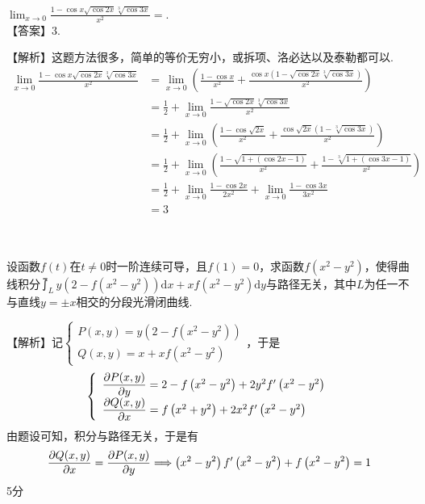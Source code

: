 \documentclass[11pt,twoside]{ctexart}
\begin{document}
\wq $\displaystyle\lim_{x\rightarrow 0}\displaystyle\frac{1-\cos x\sqrt{\cos 2x}\sqrt[3]{\cos 3x}}{x^2}=$\underline{\hspace{3em}}.\\
【答案】3.

【解析】这题方法很多，简单的等价无穷小，或拆项、洛必达以及泰勒都可以.
\begin{align*}
\lim_{x\rightarrow 0}\frac{1-\cos x\sqrt{\cos 2x}\sqrt[3]{\cos 3x}}{x^2}&=\lim_{x\rightarrow 0}\left(\frac{1-\cos x}{x^2}+\frac{\cos x\left(1-\sqrt{\cos 2x}\sqrt[3]{\cos 3x}\right)}{x^2}\right)\\
&=\frac{1}{2}+\lim_{x\rightarrow 0}\frac{1-\sqrt{\cos 2x}\sqrt[3]{\cos 3x}}{x^2}\\
&=\frac{1}{2}+\lim_{x\rightarrow 0}\left(\frac{1-\cos\sqrt{2x}}{x^2}+\frac{\cos\sqrt{2x}\left(1-\sqrt[3]{\cos 3x}\right)}{x^2}\right)\\
&=\frac{1}{2}+\lim_{x\rightarrow 0}\left(\frac{1-\sqrt{1+\left(\cos 2x-1\right)}}{x^2}+\frac{1-\sqrt[3]{1+\left(\cos 3x-1\right)}}{x^2}\right)\\
&=\frac{1}{2}+\lim_{x\rightarrow 0}\frac{1-\cos 2x}{2x^2}+\lim_{x\rightarrow 0}\frac{1-\cos 3x}{3x^2}\\
&=3
\end{align*}



\newpage
{}\\\\
设函数$f(t)$在$t\ne 0$时一阶连续可导，且$f(1)=0$，求函数$f(x^2-y^2)$，使得曲线积分$\displaystyle \upint_L{y\left(2-f\left(x^2-y^2\right)\right)}\mathrm {d}x+xf\left(x^2-y^2\right)\mathrm{d}y
$与路径无关，其中$L$为任一不与直线$y=\pm x$相交的分段光滑闭曲线.

【解析】记$\left\{ \begin{array} { l } { P ( x , y ) = y \left( 2 - f \left( x ^ { 2 } - y ^ { 2 } \right) \right) } \\
 {Q ( x , y ) = x + x f \left( x ^ { 2 } - y ^ { 2 } \right) } \end{array} \right.$，于是
\[\left\{ \begin{array} { l } { \zfrac { \partial P ( x , y ) } { \partial y } = 2 - f \left( x ^ { 2 } - y ^ { 2 } \right) + 2 y ^ { 2 } f ^ { \prime } \left( x ^ { 2 } - y ^ { 2 } \right) } \\ 
{ \zfrac { \partial Q ( x , y ) } { \partial x } = f \left( x ^ { 2 } + y ^ { 2 } \right) + 2 x ^ { 2 } f ^ { \prime } \left( x ^ { 2 } - y ^ { 2 } \right) } \end{array} \right.\]
由题设可知，积分与路径无关，于是有
\[\zfrac { \partial Q ( x , y ) } { \partial x } = \zfrac { \partial P ( x , y ) } { \partial y } \Longrightarrow \left( x ^ { 2 } - y ^ { 2 } \right) f ^ { \prime } \left( x ^ { 2 } - y ^ { 2 } \right) + f \left( x ^ { 2 } - y ^ { 2 } \right) = 1\]
\hfill\dotfill 5分
\end{document}
